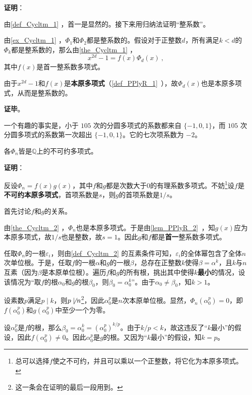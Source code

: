 \textbf{证明}：

由\autoref{def_Cycltm_1} ，首一是显然的。接下来用归纳法证明“整系数”。

由\autoref{ex_Cycltm_1} ，$\Phi_1$和$\Phi_2$都是整系数的。假设对于正整数$d$，所有满足$k<d$的$\Phi_k$都是整系数的，那么由\autoref{the_Cycltm_1} ，
\begin{equation}
x^{2d}-1 = f(x)\Phi_d(x)~,
\end{equation}
其中$f(x)$是首一整系数多项式。

由于$x^{2d}-1$和$f(x)$是\textbf{本原多项式}（\autoref{def_PPlyR_1}~），故$\Phi_d(x)$也是本原多项式，从而是整系数的。

\textbf{证毕}。

一个有趣的事实是，小于 $105$ 次的分圆多项式的系数都来自 $\{-1,0,1\}$，而 $105$ 次分圆多项式的系数第一次超出 $\{-1, 0, 1\}$。它的七次项系数为 $-2$。


\begin{theorem}{}\label{the_Cycltm_5}
各$\Phi_n$皆是$\mathbb{Q}$上的不可约多项式。
\end{theorem}

\textbf{证明}：

反设$\Phi_n=f(x)g(x)$，其中$f$和$g$都是次数大于$0$的有理系数多项式。不妨\footnote{总可以选择$f$使之不可约，并且可以乘以一个正整数，将它化为本原多项式。}设$f$是\textbf{不可约本原多项式}，首项系数是$s$，则$g$的首项系数是$1/s$。

首先讨论$f$和$g$的关系。

由\autoref{the_Cycltm_2} ，$\Phi_n$也是本原多项式。于是由\autoref{lem_PPlyR_2}~，知$g(x)$应为本原多项式，故$1/s$也是整数，故$s=1$。因此$g$和$f$都是\textbf{首一}整系数多项式。

任取$\Phi_n$的一根$\varepsilon_i$，则由\autoref{def_Cycltm_2} 的互素条件可知，$\varepsilon_i$的全体幂包含了全体$n$次单位根。于是，任取$f$的一根$\alpha$和$g$的一根$\beta$，总存在正整数$k$使得$\beta=\alpha^k$，且$k$与$n$互素（因为$\beta$是本原单位根）。遍历$f$和$g$的所有根，挑出其中使得$k$\textbf{最小}的情况，设该情况为“取$f$的根$\alpha_0$和$g$的根$\beta_0$，则$\beta_0=\alpha_0^k$”。由于$\alpha_0\neq \beta_0$，知$k>1$。

设素数$p$满足$p\mid k$，则$p\not\mid n$\footnote{这一条会在证明的最后一段用到。}，因此$\alpha_0^p$是$n$次本原单位根。显然，$\Phi_n(\alpha_0^p)=0$，即$f(\alpha_0^p)$和$g(\alpha_0^p)$中至少一个为零。

设$\alpha_0^p$是$f$的根，那么$\beta_0=\alpha_0^k=(\alpha_0^p)^{k/p}$。由于$k/p<k$，故这违反了“$k$最小”的假设，因此$f(\alpha_0^p)\neq 0$。因此$\alpha_0^p$是$g$的根。又因为“$k$最小”的假设，知$k=p$。

